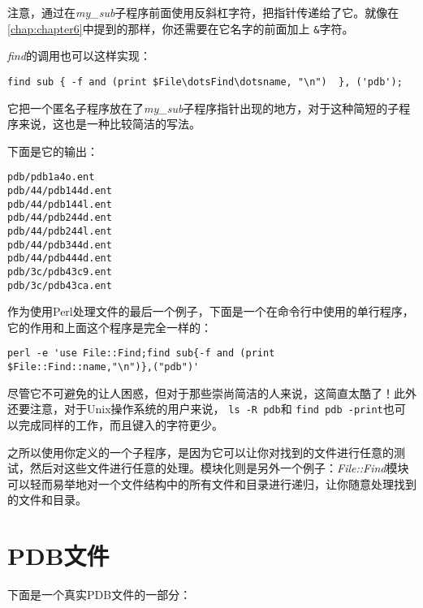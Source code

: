 注意，通过在\textit{my\_sub}子程序前面使用反斜杠字符，把指针传递给了它。就像在\autoref{chap:chapter6}中提到的那样，你还需要在它名字的前面加上 \verb|&|字符。

\textit{find}的调用也可以这样实现：

\begin{lstlisting}
find sub { -f and (print $File\dotsFind\dotsname, "\n")  }, ('pdb');
\end{lstlisting}

它把一个匿名子程序放在了\textit{my\_sub}子程序指针出现的地方，对于这种简短的子程序来说，这也是一种比较简洁的写法。

下面是它的输出：

\begin{lstlisting}
pdb/pdb1a4o.ent
pdb/44/pdb144d.ent
pdb/44/pdb144l.ent
pdb/44/pdb244d.ent
pdb/44/pdb244l.ent
pdb/44/pdb344d.ent
pdb/44/pdb444d.ent
pdb/3c/pdb43c9.ent
pdb/3c/pdb43ca.ent
\end{lstlisting}

作为使用Perl处理文件的最后一个例子，下面是一个在命令行中使用的单行程序，它的作用和上面这个程序是完全一样的：

\begin{lstlisting}
perl -e 'use File::Find;find sub{-f and (print $File::Find::name,"\n")},("pdb")'
\end{lstlisting}

尽管它不可避免的让人困惑，但对于那些崇尚简洁的人来说，这简直太酷了！此外还要注意，对于Unix操作系统的用户来说， \verb|ls -R pdb|和 \verb|find pdb -print|也可以完成同样的工作，而且键入的字符更少。

之所以使用你定义的一个子程序，是因为它可以让你对找到的文件进行任意的测试，然后对这些文件进行任意的处理。模块化则是另外一个例子：\textit{File::Find}模块可以轻而易举地对一个文件结构中的所有文件和目录进行递归，让你随意处理找到的文件和目录。

\section{PDB文件}
下面是一个真实PDB文件的一部分：

